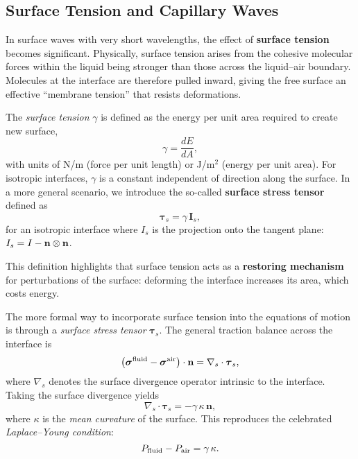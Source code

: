 \subsection{Surface Tension and Capillary Waves}

In surface waves with very short wavelengths, the effect of \textbf{surface tension} becomes significant. 
Physically, surface tension arises from the cohesive molecular forces within the liquid being stronger than those across the liquid--air boundary. Molecules at the interface are therefore pulled inward, giving the free surface an effective ``membrane tension'' that resists deformations.

\begin{definition}
The \emph{surface tension} $\gamma$ is defined as the energy per unit area required to create new surface,
\[
\gamma = \frac{dE}{dA},
\]
with units of N/m (force per unit length) or J/m$^2$ (energy per unit area). 
For isotropic interfaces, $\gamma$ is a constant independent of direction along the surface. In a more general scenario, we introduce the so-called \textbf{surface stress tensor} defined as
\[
\boldsymbol{\tau}_s = \gamma \, \mathbf{I}_s,
\]
for an isotropic interface where $I_s$ is the projection onto the tangent plane: $I_s = I - {\bf n} \otimes {\bf n}$.
\end{definition}

This definition highlights that surface tension acts as a \textbf{restoring mechanism} for perturbations of the surface: deforming the interface increases its area, which costs energy. 
\par
The more formal way to incorporate surface tension into the equations of motion is through a \emph{surface stress tensor} $\boldsymbol{\tau}_s$. The general traction balance across the interface is
\begin{equation}
\bigl(\boldsymbol{\sigma}^{\rm fluid} - \boldsymbol{\sigma}^{\rm air}\bigr)\cdot \mathbf{n} 
= \nabla_s \cdot \boldsymbol{\tau}_s,
\label{eq:general_surface_balance}
\end{equation}
where $\nabla_s$ denotes the surface divergence operator intrinsic to the interface. Taking the surface divergence yields
\[
\nabla_s \cdot \boldsymbol{\tau}_s = -\gamma\,\kappa\,\mathbf{n},
\]
where $\kappa$ is the \emph{mean curvature} of the surface. This reproduces the celebrated \emph{Laplace--Young condition}:
\begin{equation}
P_{\rm fluid} - P_{\rm air} = \gamma \,\kappa.
\label{eq:laplace_young}
\end{equation}

